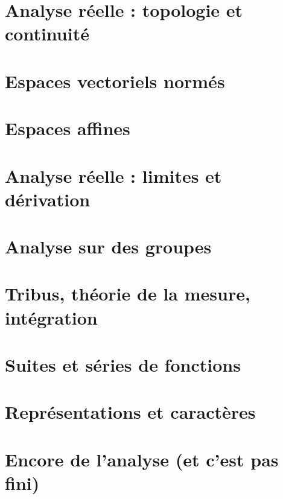 \documentclass[french,a4paper]{book}
\begin{document}
\chapter{Analyse réelle : topologie et continuité}





\chapter{Espaces vectoriels normés}






\chapter{Espaces affines}



\chapter{Analyse réelle : limites et dérivation}











\chapter{Analyse sur des groupes}


\chapter{Tribus, théorie de la mesure, intégration}







\chapter{Suites et séries de fonctions}





\chapter{Représentations et caractères}


\chapter{Encore de l'analyse (et c'est pas fini)}




\end{document}

